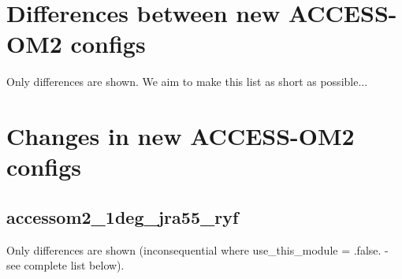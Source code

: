\documentclass[10pt]{article}
\newcommand{\nmldiffer}[1]{#1} %
\newcommand{\doscript}[1]{{\footnotesize\textsf{}}}
\begin{document}
%


\newpage
\renewcommand{\nmldiffer}[1]{#1} %
\section{Differences between new ACCESS-OM2 configs}
Only differences are shown. We aim to make this list as short as possible...
\doscript{/Users/andy/anaconda/bin/python3 /Users/andy/bin/nmltab.py -d --format latex new_accessom2_1deg_jra55_ryf_input.nml new_accessom2_025deg_jra55_ryf_input.nml new_accessom2_01deg_jra55_ryf_input.nml}

\newpage
\section{Changes in new ACCESS-OM2 configs}
\subsection{accessom2_1deg_jra55_ryf}
Only differences are shown (inconsequential where use_this_module = .false. - see complete list below).
\doscript{/Users/andy/anaconda/bin/python3 /Users/andy/bin/nmltab.py -d --format latex original/hogg_accessom2_1deg_jra55_ryf_input.nml new_accessom2_1deg_jra55_ryf_input.nml }
\end{document}
